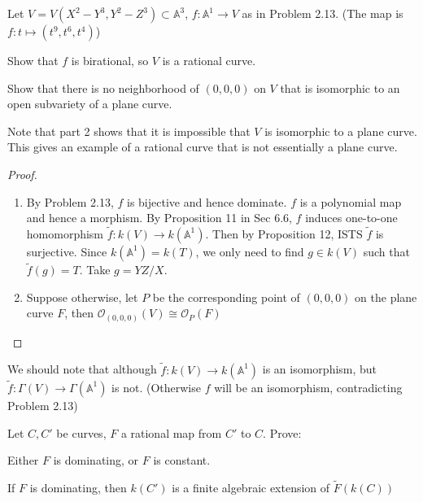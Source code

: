 \documentclass{solution}
\begin{document}
\begin{problem}{6.44}
    Let $V = V(X^2 - Y^3, Y^2 - Z^3) \subset \mathbb{A}^3$, $f: \mathbb{A}^1 \rightarrow V$ as in Problem 2.13. (The map is $f: t \mapsto (t^9, t^6, t^4)$) \begin{inparaenum}
        \item Show that $f$ is birational, so $V$ is a rational curve.
        \item Show that there is no neighborhood of $(0, 0, 0)$ on $V$ that is isomorphic to an open subvariety of a plane curve.
    \end{inparaenum}
\end{problem}

Note that part 2 shows that it is impossible that $V$ is isomorphic to a plane curve. This gives an example of a rational curve that is not essentially a plane curve.

\begin{proof}
    \begin{enumerate}
        \item By Problem 2.13, $f$ is bijective and hence dominate. $f$ is a polynomial map and hence a morphism. By Proposition 11 in Sec 6.6, $f$ induces one-to-one homomorphism $\tilde{f}: k(V) \rightarrow k(\mathbb{A}^1)$. Then by Proposition 12, ISTS $\tilde{f}$ is surjective. Since $k(\mathbb{A}^1) = k(T)$, we only need to find $g \in k(V)$ such that $\tilde{f}(g) = T$. Take $g = YZ / X$.
        \item Suppose otherwise, let $P$ be the corresponding point of $(0, 0, 0)$ on the plane curve $F$, then $\mathcal{O}_{(0, 0, 0)}(V) \cong \mathcal{O}_{P}(F)$ \TODO
    \end{enumerate}
\end{proof}

We should note that although $\tilde{f}: k(V) \rightarrow k(\mathbb{A}^1)$ is an isomorphism, but $\tilde{f}: \Gamma(V) \rightarrow \Gamma(\mathbb{A}^1)$ is not. (Otherwise $f$ will be an isomorphism, contradicting Problem 2.13)

\begin{problem}{6.45}
    Let $C, C'$ be curves, $F$ a rational map from $C'$ to $C$. Prove:
    \begin{inparaenum}
        \item Either $F$ is dominating, or $F$ is constant. 
        \item If $F$ is dominating, then $k(C')$ is a finite algebraic extension of $\tilde{F}(k(C))$
    \end{inparaenum}
\end{problem}
\end{document}
